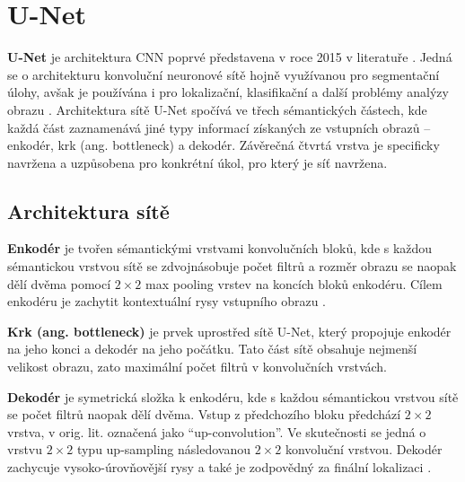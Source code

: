 \section{U-Net}
\label{sec:Chapter22}

\textbf{U-Net} je architektura CNN poprvé představena v roce 2015 v literatuře \cite{unet}. Jedná se o architekturu konvoluční neuronové sítě hojně využívanou pro segmentační úlohy, avšak je používána i pro lokalizační, klasifikační a další problémy analýzy obrazu \cite{unet_success}. Architektura sítě U-Net spočívá ve třech sémantických částech, kde každá část zaznamenává jiné typy informací získaných ze vstupních obrazů -- enkodér, krk (ang. bottleneck) a dekodér. Závěrečná čtvrtá vrstva je specificky navržena a uzpůsobena pro konkrétní úkol, pro který je síť navržena.

\subsection{Architektura sítě}
\label{subsec:Chapter221}

\textbf{Enkodér} je tvořen sémantickými vrstvami konvolučních bloků, kde s každou sémantickou vrstvou sítě se zdvojnásobuje počet filtrů a rozměr obrazu se naopak dělí dvěma pomocí $2\times2$ max pooling vrstev na koncích bloků enkodéru. Cílem enkodéru je zachytit kontextuální rysy vstupního obrazu \cite{unet_success}.

\textbf{Krk (ang. bottleneck)} je prvek uprostřed sítě U-Net, který propojuje enkodér na jeho konci a dekodér na jeho počátku. Tato část sítě obsahuje nejmenší velikost obrazu, zato maximální počet filtrů v konvolučních vrstvách.

\textbf{Dekodér} je symetrická složka k enkodéru, kde s každou sémantickou vrstvou sítě se počet filtrů naopak dělí dvěma. Vstup z předchozího bloku předchází $2\times2$ vrstva, v orig. lit. označená jako \enquote{up-convolution}. Ve skutečnosti se jedná o vrstvu $2\times2$ typu up-sampling následovanou $2\times2$ konvoluční vrstvou. Dekodér zachycuje vysoko-úrovňovější rysy a také je zodpovědný za finální lokalizaci \cite{unet_success}.

